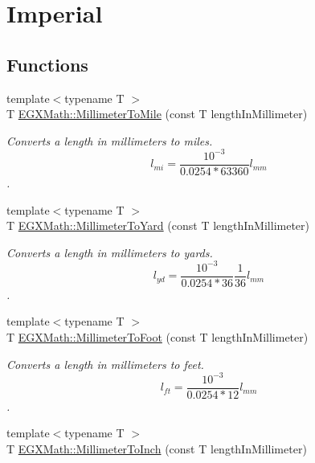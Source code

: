 \hypertarget{group___e_g_x_math-_conversions-_length_conversions-_millimeter-_imperial}{}\section{Imperial}
\label{group___e_g_x_math-_conversions-_length_conversions-_millimeter-_imperial}
\subsection*{Functions}
\begin{DoxyCompactItemize}
\item 
{\footnotesize template$<$typename T $>$ }\\T \mbox{\hyperlink{group___e_g_x_math-_conversions-_length_conversions-_millimeter-_imperial_ga8a11dcd8f7866189b30e01d65e003e2d}{E\+G\+X\+Math\+::\+Millimeter\+To\+Mile}} (const T length\+In\+Millimeter)
\begin{DoxyCompactList}\small\item\em Converts a length in millimeters to miles. \[ l_{mi}=\frac{10^{-3}}{0.0254 * 63360} l_{mm} \]. \end{DoxyCompactList}\item 
{\footnotesize template$<$typename T $>$ }\\T \mbox{\hyperlink{group___e_g_x_math-_conversions-_length_conversions-_millimeter-_imperial_gae1b144c2bc56f6591e0ee9b37f0653fa}{E\+G\+X\+Math\+::\+Millimeter\+To\+Yard}} (const T length\+In\+Millimeter)
\begin{DoxyCompactList}\small\item\em Converts a length in millimeters to yards. \[ l_{yd}= \frac{10^{-3}}{0.0254 * 36} \frac{1}{36} l_{mm} \]. \end{DoxyCompactList}\item 
{\footnotesize template$<$typename T $>$ }\\T \mbox{\hyperlink{group___e_g_x_math-_conversions-_length_conversions-_millimeter-_imperial_ga96513545d32f8e86044a3a3551840023}{E\+G\+X\+Math\+::\+Millimeter\+To\+Foot}} (const T length\+In\+Millimeter)
\begin{DoxyCompactList}\small\item\em Converts a length in millimeters to feet. \[ l_{ft}= \frac{10^{-3}}{0.0254 * 12} l_{mm} \]. \end{DoxyCompactList}\item 
{\footnotesize template$<$typename T $>$ }\\T \mbox{\hyperlink{group___e_g_x_math-_conversions-_length_conversions-_millimeter-_imperial_gaaf0d8029c38ed975edf3805a0a3a53f7}{E\+G\+X\+Math\+::\+Millimeter\+To\+Inch}} (const T length\+In\+Millimeter)

\end{DoxyCompactItemize}
